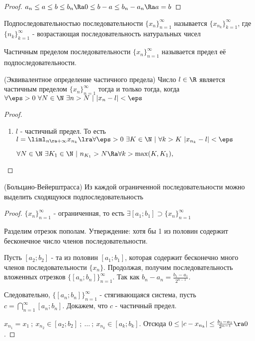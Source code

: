 \begin{proof}
	$a_n \le a \le b \le b_n \Ra 0 \le b - a \le b_n - a_n \Ra a = b$
\end{proof}

\begin{definition}
	Подпоследовательностью последовательности $\{x_n\}_{n = 1}^\infty$ называется $\{x_{n_k}\}_{k = 1}^\infty$, где $\{n_k\}_{k = 1}^\infty$ - возрастающая последовательность натуральных чисел
\end{definition}

\begin{definition}
	Частичным пределом последовательности $\{x_n\}_{n = 1}^\infty$ называется предел её подпоследовательности.
\end{definition}

\begin{theorem} (Эквивалентное определение частичного предела)
	Число $l \in \R$ является частичным пределом $\{x_n\}_{n = 1}^\infty$ тогда и только тогда, когда $\forall \eps > 0\ \forall N \in \N\ \exists n > N\ |\ |x_n - l| < \eps$
\end{theorem}

\begin{proof}
\begin{enumerate}
	\item $l$ - частичный предел. То есть $l = \liml_{n \ra +\infty} x_{n_k} \lra \forall \eps > 0\ \exists K \in \N\ |\ \forall k > K\ |x_{n_k} - l| < \eps$
	
	$\forall N \in \N\ \exists K_1 \in \N\ |\ n_{K_1} > N \Ra \forall k > \max(K, K_1), $
	
\end{enumerate}
\end{proof}

\begin{theorem} (Больцано-Вейерштрасса)
	Из каждой ограниченной последовательности можно выделить сходящуюся подпоследовательность
\end{theorem}

\begin{proof}
	$\{x_n\}_{n = 1}^\infty$ - ограниченная, то есть $\exists [a_1; b_1] \supset \{x_n\}_{n = 1}^\infty$
	
	Разделим отрезок пополам. Утверждение: хотя бы 1 из половин содержит бесконечное число членов последовательности.
	
	Пусть $[a_2; b_2]$ - та из половин $[a_1; b_1]$, которая содержит бесконечно много членов последовательности $\{x_n\}$. Продолжая, получим последовательность вложенных отрезков $\{[a_n; b_n]\}_{n = 1}^\infty$. Так как $b_n - a_n = \frac{b_1 - a_1}{2^{n - 1}}$.
	
	Следовательно, $\{[a_n; b_n]\}_{n = 1}^\infty$ - стягивающаяся система, пусть $c = \bigcap\limits_{n = 1}^\infty [a_n; b_n]$. Докажем, что $c$ - частичный предел.
	
	$x_{n_1} = x_1\ ;\ x_{n_2} \in [a_2; b_2]\ ;\ \dots\ ;\ x_{n_k} \in [a_k; b_k]$. Отсюда $0 \le |c - x_{n_k}| \le \frac{b_1 - a_1}{2^{n - 1}} \ra 0$.
\end{proof}

